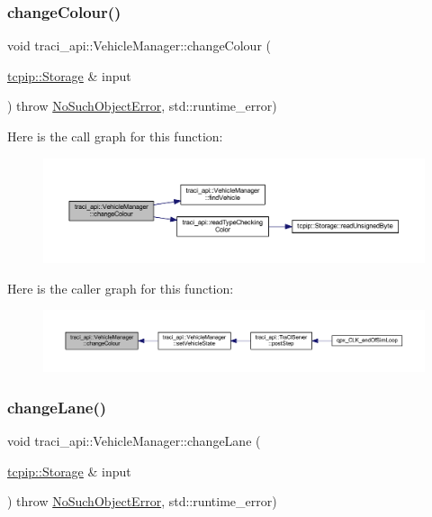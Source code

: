 \subsubsection{\texorpdfstring{change\+Colour()}{changeColour()}}
{\footnotesize\ttfamily void traci\+\_\+api\+::\+Vehicle\+Manager\+::change\+Colour (\begin{DoxyParamCaption}\item[{\hyperlink{classtcpip_1_1_storage}{tcpip\+::\+Storage} \&}]{input }\end{DoxyParamCaption}) throw  \hyperlink{classtraci__api_1_1_no_such_object_error}{No\+Such\+Object\+Error}, std\+::runtime\+\_\+error) }

Here is the call graph for this function\+:
\nopagebreak
\begin{figure}[H]
\begin{center}
\leavevmode
\includegraphics[width=350pt]{classtraci__api_1_1_vehicle_manager_a6829e259033dcd95611755953f164ef0_cgraph}
\end{center}
\end{figure}
Here is the caller graph for this function\+:
\nopagebreak
\begin{figure}[H]
\begin{center}
\leavevmode
\includegraphics[width=350pt]{classtraci__api_1_1_vehicle_manager_a6829e259033dcd95611755953f164ef0_icgraph}
\end{center}
\end{figure}
\mbox{\label{classtraci__api_1_1_vehicle_manager_a5441f5ea01a06473f831ac85b9a6c70f}} 
\subsubsection{\texorpdfstring{change\+Lane()}{changeLane()}}
{\footnotesize\ttfamily void traci\+\_\+api\+::\+Vehicle\+Manager\+::change\+Lane (\begin{DoxyParamCaption}\item[{\hyperlink{classtcpip_1_1_storage}{tcpip\+::\+Storage} \&}]{input }\end{DoxyParamCaption}) throw  \hyperlink{classtraci__api_1_1_no_such_object_error}{No\+Such\+Object\+Error}, std\+::runtime\+\_\+error) }

